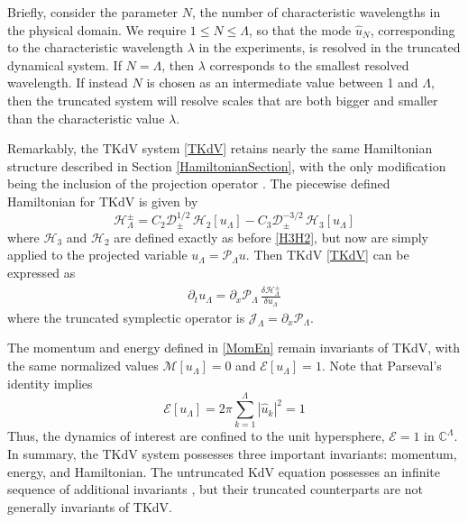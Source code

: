 \documentclass[11pt]{article}
\newcommand{\abs}[1]{\left| #1 \right|}
\newcommand{\CC}{{\mathbb{C}}}
\newcommand{\lam}{\lambda}
\newcommand{\lamfac}{N}
\newcommand{\drat}{\mathcal{D}}
\newcommand{\dratupdn}{\drat_{\pm}}
\newcommand{\En}{\mathcal{E}}
\newcommand{\Mo}{\mathcal{M}}
\newcommand{\uhat}{\hat{u}}
\newcommand{\sympJ}{\mathcal{J}}
\newcommand{\vard}[2]{\frac{\delta #1}{\delta #2}}
\newcommand{\Ham}{\mathcal{H}}
\newcommand{\Hthree}{\Ham_{3}}
\newcommand{\Htwo}{\Ham_{2}}
\newcommand{\Proj}{\mathcal{P}_{\Lambda}}
\newcommand{\uL}{u_{\Lambda}}
\newcommand{\HLupdn}{\Ham_{\Lambda}^{\pm}}
\newcommand{\SympL}{\sympJ_{\Lambda}}
\begin{document}
Briefly, consider the parameter $\lamfac$, the number of characteristic wavelengths in the physical domain. We require $1 \le \lamfac \le \Lambda$, so that the mode $\uhat_{\lamfac}$, corresponding to the characteristic wavelength $\lam$ in the experiments, is resolved in the truncated dynamical system. If $\lamfac = \Lambda$, then $\lam$ corresponds to the smallest resolved wavelength. If instead $\lamfac$ is chosen as an intermediate value between 1 and $\Lambda$, then the truncated system will resolve scales that are both bigger and smaller than the characteristic value $\lam$.

Remarkably, the TKdV system \eqref{TKdV} retains nearly the same Hamiltonian structure described in Section \ref{HamiltonianSection}, with the only modification being the inclusion of the projection operator \cite{bajars2013weakly, majda2019}. The piecewise defined Hamiltonian for TKdV is given by
\begin{equation}
\label{TruncHamiltonian}
\HLupdn = C_2 \dratupdn^{1/2} \, \Htwo[\uL] - C_3 \dratupdn^{-3/2} \, \Hthree[\uL]
\end{equation}
where $\Hthree$ and $\Htwo$ are defined exactly as before \eqref{H3H2}, but now are simply applied to the projected variable $\uL = \Proj u$.
Then TKdV \eqref{TKdV} can be expressed as
\begin{align}
\partial_t {\uL} = \partial_x \Proj \, \vard{\HLupdn}{\uL}
\end{align}
where the truncated symplectic operator is $\SympL = \partial_x \Proj$.

The momentum and energy defined in \eqref{MomEn} remain invariants of TKdV, with the same normalized values $\Mo[\uL] = 0$ and $\En[\uL] = 1$. Note that Parseval's identity implies
\begin{equation}
\En[\uL] = 2 \pi \sum_{k=1}^{\Lambda} \abs{\uhat_k}^2 = 1
\end{equation}
Thus, the dynamics of interest are confined to the unit hypersphere, $\En = 1$ in $\CC^{\Lambda}$.
In summary, the TKdV system possesses three important invariants: momentum, energy, and Hamiltonian. The untruncated KdV equation possesses an infinite sequence of additional invariants \cite{lax1975periodic, whitham2011linear}, but their truncated counterparts are not generally invariants of TKdV.


\end{document}
